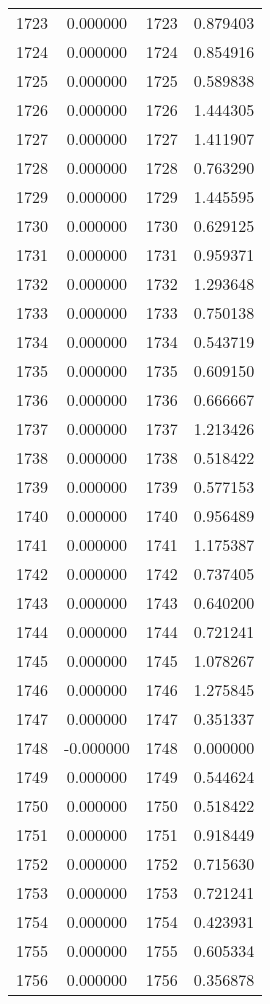 \documentclass[12pt]{article}
\begin{document}
\begin{longtable}{@{}cccc@{}}
1723 & 0.000000 & 1723 & 0.879403 \\
1724 & 0.000000 & 1724 & 0.854916 \\
1725 & 0.000000 & 1725 & 0.589838 \\
1726 & 0.000000 & 1726 & 1.444305 \\
1727 & 0.000000 & 1727 & 1.411907 \\
1728 & 0.000000 & 1728 & 0.763290 \\
1729 & 0.000000 & 1729 & 1.445595 \\
1730 & 0.000000 & 1730 & 0.629125 \\
1731 & 0.000000 & 1731 & 0.959371 \\
1732 & 0.000000 & 1732 & 1.293648 \\
1733 & 0.000000 & 1733 & 0.750138 \\
1734 & 0.000000 & 1734 & 0.543719 \\
1735 & 0.000000 & 1735 & 0.609150 \\
1736 & 0.000000 & 1736 & 0.666667 \\
1737 & 0.000000 & 1737 & 1.213426 \\
1738 & 0.000000 & 1738 & 0.518422 \\
1739 & 0.000000 & 1739 & 0.577153 \\
1740 & 0.000000 & 1740 & 0.956489 \\
1741 & 0.000000 & 1741 & 1.175387 \\
1742 & 0.000000 & 1742 & 0.737405 \\
1743 & 0.000000 & 1743 & 0.640200 \\
1744 & 0.000000 & 1744 & 0.721241 \\
1745 & 0.000000 & 1745 & 1.078267 \\
1746 & 0.000000 & 1746 & 1.275845 \\
1747 & 0.000000 & 1747 & 0.351337 \\
1748 & -0.000000 & 1748 & 0.000000 \\
1749 & 0.000000 & 1749 & 0.544624 \\
1750 & 0.000000 & 1750 & 0.518422 \\
1751 & 0.000000 & 1751 & 0.918449 \\
1752 & 0.000000 & 1752 & 0.715630 \\
1753 & 0.000000 & 1753 & 0.721241 \\
1754 & 0.000000 & 1754 & 0.423931 \\
1755 & 0.000000 & 1755 & 0.605334 \\
1756 & 0.000000 & 1756 & 0.356878 \\

\end{longtable}
\end{document}
